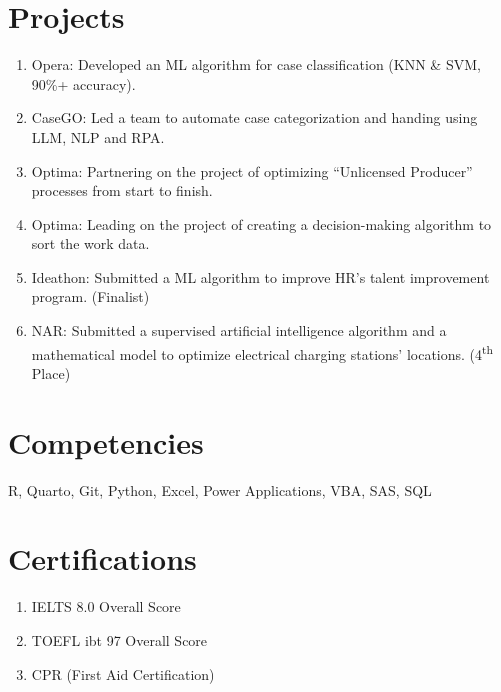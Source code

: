 \documentclass[
  letterpaper,
  DIV=11,
  numbers=noendperiod]{scrartcl}
\providecommand{\tightlist}{%
  \setlength{\itemsep}{0pt}\setlength{\parskip}{0pt}}
\begin{document}
\section{Projects}\label{projects}

\begin{enumerate}
\def\labelenumi{\arabic{enumi}.}
\tightlist
\item
  Opera: Developed an ML algorithm for case classification (KNN \& SVM,
  90\%+ accuracy).
\item
  CaseGO: Led a team to automate case categorization and handing using
  LLM, NLP and RPA.
\item
  Optima: Partnering on the project of optimizing ``Unlicensed
  Producer'' processes from start to finish.
\item
  Optima: Leading on the project of creating a decision-making algorithm
  to sort the work data.
\item
  Ideathon: Submitted a ML algorithm to improve HR's talent improvement
  program. (Finalist)
\item
  NAR: Submitted a supervised artificial intelligence algorithm and a
  mathematical model to optimize electrical charging stations'
  locations. (4\textsuperscript{th} Place)
\end{enumerate}

\section{Competencies}\label{competencies}

R, Quarto, Git, Python, Excel, Power Applications, VBA, SAS, SQL

\section{Certifications}\label{certifications}

\begin{enumerate}
\def\labelenumi{\arabic{enumi}.}
\tightlist
\item
  IELTS 8.0 Overall Score
\item
  TOEFL ibt 97 Overall Score
\item
  CPR (First Aid Certification)
\end{enumerate}
\end{document}
